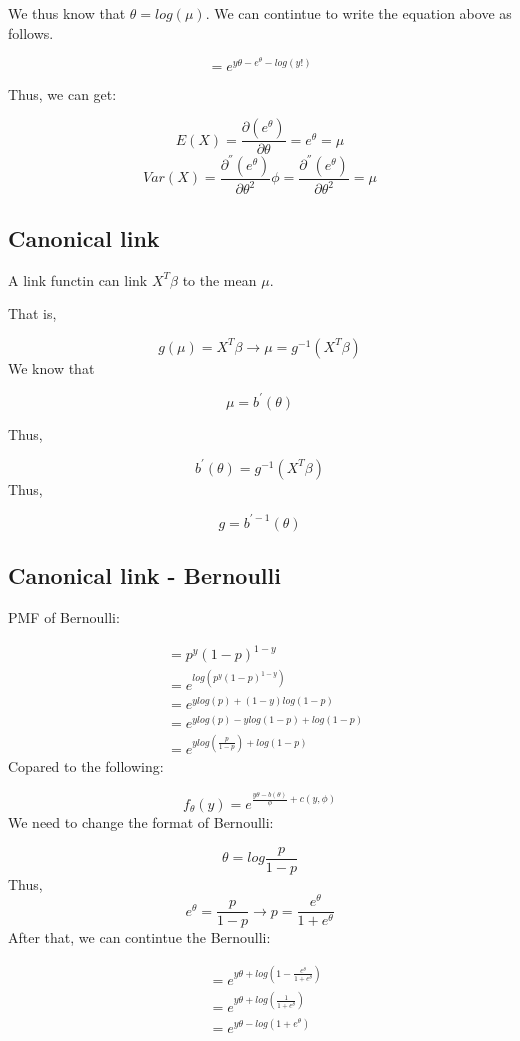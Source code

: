 \documentclass[]{book}
\begin{document}
We thus know that \(\theta=log(\mu)\). We can contintue to write the equation above as follows.

\[=e^{y\theta-e^{\theta}-log(y!)}\]

Thus, we can get:

\[E(X)=\frac{\partial (e^{\theta})}{\partial \theta}=e^{\theta}=\mu\]
\[Var(X)=\frac{\partial^{''} (e^{\theta})}{\partial \theta^2} \phi=\frac{\partial^{''} (e^{\theta})}{\partial \theta^2}=\mu\]

\hypertarget{canonical-link}{%
\subsection{Canonical link}\label{canonical-link}}

A link functin can link \(X^T \beta\) to the mean \(\mu\).

That is,

\[g(\mu)=X^T \beta \rightarrow \mu = g^{-1}(X^T \beta)\]
We know that

\[\mu = b^{'}(\theta)\]

Thus,

\[ b^{'}(\theta)=g^{-1}(X^T \beta)\]
Thus,

\[g=b^{' -1}(\theta)\]

\hypertarget{canonical-link---bernoulli}{%
\subsection{Canonical link - Bernoulli}\label{canonical-link---bernoulli}}

PMF of Bernoulli:

\[ \begin{aligned} &= p^y(1-p)^{1-y}  \\ &=e^{log(p^y(1-p)^{1-y})} \\ &= e^{ylog(p)+(1-y)log(1-p)}\\ &= e^{ylog(p)-ylog(1-p)+log(1-p)}\\ &=e^{ylog(\frac{p}{1-p})+log(1-p)} \end{aligned} \]
Copared to the following:

\[f_{\theta}(y)=e^{\frac{y\theta-b(\theta)}{\phi}+c(y,\phi)}\]
We need to change the format of Bernoulli:

\[\theta= log \frac{p}{1-p}\]
Thus,
\[e^{\theta}=\frac{p}{1-p} \rightarrow p=\frac{e^{\theta}}{1+e^{\theta}} \]
After that, we can contintue the Bernoulli:

\[\begin{aligned} &= e^{y\theta+log(1-\frac{e^{\theta}}{1+e^{\theta}})} \\ &=e^{y\theta+log(\frac{1}{1+e^{\theta}})} \\ &=e^{y\theta-log(1+e^{\theta})} \end{aligned}\]
\end{document}
